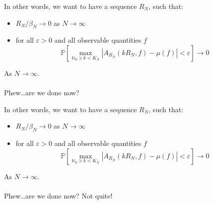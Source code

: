 \documentclass{beamer}
\begin{document}
\begin{frame}
    In other words, we want to have a sequence $R_N$, such that:
    \begin{itemize}
        \item $R_N / \beta_N \rightarrow 0$ as $N \rightarrow \infty$
        \item for all $\varepsilon > 0$ and all observable quantities $f$
        \[
            \mathbb{P}\left[ \max_{\mathbb{N}_0 \ni k < K_N}|A_{R_N}(kR_N, f) - \mu(f)| < \varepsilon\right] \rightarrow 0
        \]
    \end{itemize}

    As $N \rightarrow \infty$. \\~\\
    Phew\ldots are we done now?
\end{frame}

\begin{frame}
    In other words, we want to have a sequence $R_N$, such that:
    \begin{itemize}
        \item $R_N / \beta_N \rightarrow 0$ as $N \rightarrow \infty$
        \item for all $\varepsilon > 0$ and all observable quantities $f$
        \[
            \mathbb{P}\left[ \max_{\mathbb{N}_0 \ni k < K_N}|A_{R_N}(kR_N, f) - \mu(f)| < \varepsilon\right] \rightarrow 0
        \]
    \end{itemize}

    As $N \rightarrow \infty$. \\~\\
    Phew\ldots are we done now? Not quite!
\end{frame}
\end{document}

